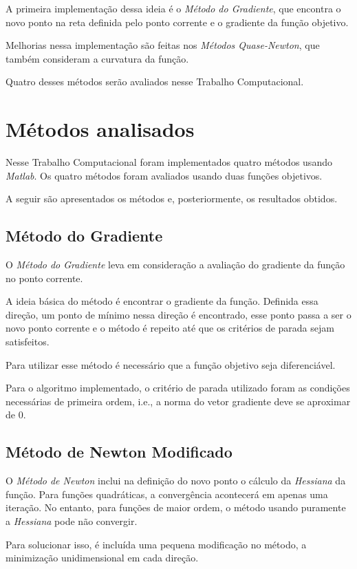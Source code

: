 \documentclass[10pt,a4paper]{article}
\begin{document}
	A primeira implementação dessa ideia é o \emph{Método do Gradiente}, que encontra o novo ponto na reta definida pelo ponto corrente e
	o gradiente da função objetivo.

	Melhorias nessa implementação são feitas nos \emph{Métodos Quase-Newton}, que também consideram a curvatura da função.

	Quatro desses métodos serão avaliados nesse Trabalho Computacional.

	\section{Métodos analisados}

	Nesse Trabalho Computacional foram implementados quatro métodos usando \emph{Matlab}. Os quatro métodos foram avaliados usando duas funções objetivos.

	A seguir são apresentados os métodos e, posteriormente, os resultados obtidos.

	\subsection{Método do Gradiente}

	O \emph{Método do Gradiente} leva em consideração a avaliação do gradiente da função no ponto corrente.

	A ideia básica do método é encontrar o gradiente da função. Definida essa direção, um ponto de mínimo nessa direção é encontrado, 
	esse ponto passa a ser o novo ponto corrente e o método é repeito até que os critérios de parada sejam satisfeitos.

	Para utilizar esse método é necessário que a função objetivo seja diferenciável.

	Para o algoritmo implementado, o critério de parada utilizado foram as condições necessárias de primeira ordem, i.e., a norma do vetor gradiente deve se aproximar de 0.

	\subsection{Método de Newton Modificado}

	O \emph{Método de Newton} inclui na definição do novo ponto o cálculo da \emph{Hessiana} da função. Para funções quadráticas, a convergência acontecerá em apenas uma iteração. No entanto, para funções de maior ordem, o método usando puramente a \emph{Hessiana} pode não convergir.

	Para solucionar isso, é incluída uma pequena modificação no método, a minimização unidimensional em cada direção.
\end{document}
